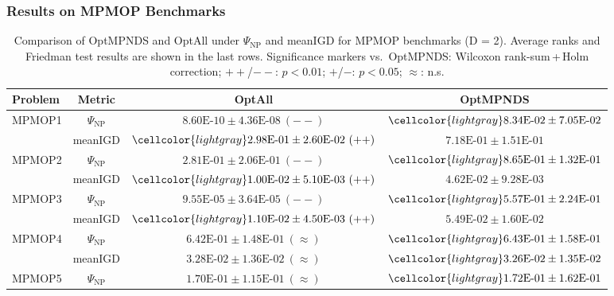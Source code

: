 \documentclass[journal]{IEEEtran}
\begin{document}
\subsubsection{Results on MPMOP Benchmarks}

\begin{table}[htbp]
	\centering
	\caption{Comparison of OptMPNDS and OptAll under $\Psi_{\mathrm{NP}}$ and meanIGD for MPMOP benchmarks (D = 2). Average ranks and Friedman test results are shown in the last rows. Significance markers vs.\ OptMPNDS: Wilcoxon rank-sum\,+\,Holm correction; $++$/$--$: $p<0.01$; $+$/$-$: $p<0.05$; $\approx$: n.s.}
	\label{tab:MPMOP_results}
	\renewcommand{\arraystretch}{1.1}
	\setlength{\tabcolsep}{1.5pt}
	\footnotesize
	\begin{tabular}{@{}lccc@{}}
		\toprule
		Problem & Metric & \multicolumn{1}{c}{OptAll} & \multicolumn{1}{c}{OptMPNDS} \\
		\midrule
		\multirow{2}{*}{MPMOP1} 
		& $\Psi_{\mathrm{NP}}$ & $8.60\text{E-}10 \pm 4.36\text{E-}08\ (--)$ & $\cellcolor{lightgray} 8.34\text{E-}02 \pm 7.05\text{E-}02$ \\
		& meanIGD & $\cellcolor{lightgray} 2.98\text{E-}01 \pm 2.60\text{E-}02\ (++)$ & $7.18\text{E-}01 \pm 1.51\text{E-}01$ \\
		\midrule
		\multirow{2}{*}{MPMOP2} 
		& $\Psi_{\mathrm{NP}}$ & $2.81\text{E-}01 \pm 2.06\text{E-}01\ (--)$ & $\cellcolor{lightgray} 8.65\text{E-}01 \pm 1.32\text{E-}01$ \\
		& meanIGD & $\cellcolor{lightgray} 1.00\text{E-}02 \pm 5.10\text{E-}03\ (++)$ & $4.62\text{E-}02 \pm 9.28\text{E-}03$ \\
		\midrule
		\multirow{2}{*}{MPMOP3} 
		& $\Psi_{\mathrm{NP}}$ & $9.55\text{E-}05 \pm 3.64\text{E-}05\ (--)$ & $\cellcolor{lightgray} 5.57\text{E-}01 \pm 2.24\text{E-}01$ \\
		& meanIGD & $\cellcolor{lightgray} 1.10\text{E-}02 \pm 4.50\text{E-}03\ (++)$ & $5.49\text{E-}02 \pm 1.60\text{E-}02$ \\
		\midrule
		\multirow{2}{*}{MPMOP4} 
		& $\Psi_{\mathrm{NP}}$ & $6.42\text{E-}01 \pm 1.48\text{E-}01\ (\approx)$ & $\cellcolor{lightgray} 6.43\text{E-}01 \pm 1.58\text{E-}01$ \\
		& meanIGD & $3.28\text{E-}02 \pm 1.36\text{E-}02\ (\approx)$ & $\cellcolor{lightgray} 3.26\text{E-}02 \pm 1.35\text{E-}02$ \\
		\midrule
		\multirow{2}{*}{MPMOP5} 
		& $\Psi_{\mathrm{NP}}$ & $1.70\text{E-}01 \pm 1.15\text{E-}01\ (\approx)$ & $\cellcolor{lightgray} 1.72\text{E-}01 \pm 1.62\text{E-}01$ \\

\end{tabular}
\end{table}
\end{document}
